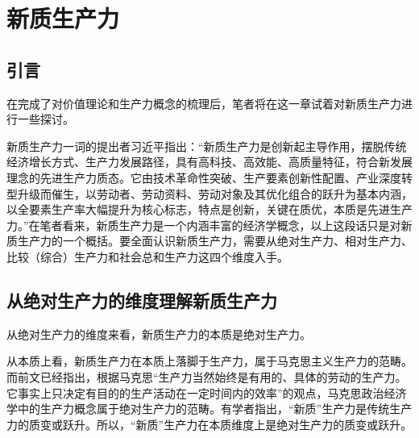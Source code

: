 \chapter{新质生产力}

\section{引言}

在完成了对价值理论和生产力概念的梳理后，笔者将在这一章试着对新质生产力进行一些探讨。

新质生产力一词的提出者习近平指出：“新质生产力是创新起主导作用，摆脱传统经济增长方式、生产力发展路径，具有高科技、高效能、高质量特征，符合新发展理念的先进生产力质态。它由技术革命性突破、生产要素创新性配置、产业深度转型升级而催生，以劳动者、劳动资料、劳动对象及其优化组合的跃升为基本内涵，以全要素生产率大幅提升为核心标志，特点是创新，关键在质优，本质是先进生产力。”\cite[515-516]{XiJinPingXiJinPingJingJiWenXuanDiYiJuan2025}在笔者看来，新质生产力是一个内涵丰富的经济学概念，以上这段话只是对新质生产力的一个概括。要全面认识新质生产力，需要从绝对生产力、相对生产力、比较（综合）生产力和社会总和生产力这四个维度入手。

\section{从绝对生产力的维度理解新质生产力}

从绝对生产力的维度来看，新质生产力的本质是绝对生产力。

从本质上看，新质生产力在本质上落脚于生产力\cite[138]{ZhangLinXinZhiShengChanLiDeNeiHanTeZhengLiLunChuangXinYuJieZhiYiYun2023}，属于马克思主义生产力的范畴\cite[7]{RenBaoPingXinZhiShengChanLiWenXianZongShuYuYanJiuZhanWang2024}\cite[2-4]{ZhouWenLunXinZhiShengChanLiNeiHanTeZhengYuChongYaoZhaoLiDian2023}\cite[129]{GaoFanXinZhiShengChanLiDeTiChuLuoJiDuoWeiNeiHanJiShiDaiYiYi2023}\cite[1-2]{PuQingPingXiJinPingZongShuJiGuanYuXinZhiShengChanLiChongYaoLunShuDeShengChengLuoJiLiLunChuangXinYuShiDaiJieZhi2023}\cite[15-16]{RenBaoPingShengChanLiXianDaiHuaZhuanXingXingChengXinZhiShengChanLiDeLuoJi2024}。而前文已经指出，根据马克思“生产力当然始终是有用的、具体的劳动的生产力。它事实上只决定有目的的生产活动在一定时间内的效率”\cite[59]{ZhongGongZhongYangMaKeSiEnGeSiLieNingSiDaLinZhuZuoBianYiJuMaKeSiEnGeSiWenJiDi5Juan2009}的观点，马克思政治经济学中的生产力概念属于绝对生产力的范畴。有学者指出，“新质”生产力是传统生产力的质变或跃升\cite[3]{ZhouWenLunXinZhiShengChanLiNeiHanTeZhengYuChongYaoZhaoLiDian2023}\cite[143]{ZhangLinXinZhiShengChanLiDeNeiHanTeZhengLiLunChuangXinYuJieZhiYiYun2023}\cite[52]{XuZhengXinZhiShengChanLiFuNengGaoZhiLiangFaZhanDeNeiZaiLuoJiYuShiJianGouXiang2023}\cite[2]{PuQingPingXiJinPingZongShuJiGuanYuXinZhiShengChanLiChongYaoLunShuDeShengChengLuoJiLiLunChuangXinYuShiDaiJieZhi2023}\cite[13]{RenBaoPingShengChanLiXianDaiHuaZhuanXingXingChengXinZhiShengChanLiDeLuoJi2024}\cite[6]{RenBaoPingXinZhiShengChanLiWenXianZongShuYuYanJiuZhanWang2024}。所以，“新质”生产力在本质维度上是绝对生产力的质变或跃升。

